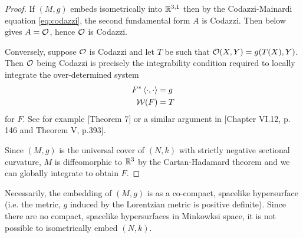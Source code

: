 \documentclass[a4paper, 12pt]{amsart}
\begin{document}
\begin{proof}
If \((M, g)\) embeds isometrically into \(\mathbb{R}^{3,1}\) then by the Codazzi-Mainardi equation \eqref{eq:codazzi}, the second fundamental form \(A\) is Codazzi. Then  below gives \(A = \operatorname{\mathcal{O}}\), hence \(\operatorname{\mathcal{O}}\) is Codazzi.

Conversely, suppose \(\operatorname{\mathcal{O}}\) is Codazzi and let \(T\) be such that \(\operatorname{\mathcal{O}}(X, Y) = g(T(X), Y)\). Then \(\operatorname{\mathcal{O}}\) being Codazzi is precisely the integrability condition required to locally integrate the over-determined system
\begin{align*}
F^{\ast} \left\langle \cdot,\cdot \right\rangle &= g \\
\operatorname{\mathcal{W}}(F) &= T
\end{align*}
for \(F\). See for example \cite{MR1713298}[Theorem 7] or a similar argument in \cite{MR1013365}[Chapter VI.12, p. 146 and Theorem V, p.393].

Since \((M, g)\) is the universal cover of \((N, k)\) with strictly negative sectional curvature, \(M\) is diffeomorphic to \(\mathbb{R}^3\) by the Cartan-Hadamard theorem and we can globally integrate to obtain \(F\).
\end{proof}

\begin{rem}
Necessarily, the embedding of \((M, g)\) is as a co-compact, spacelike hypersurface (i.e. the metric, \(g\) induced by the Lorentzian metric is positive definite). Since there are no compact, spacelike hypersurfaces in Minkowksi space, it is not possible to isometrically embed \((N, k)\).
\end{rem}
\end{document}
